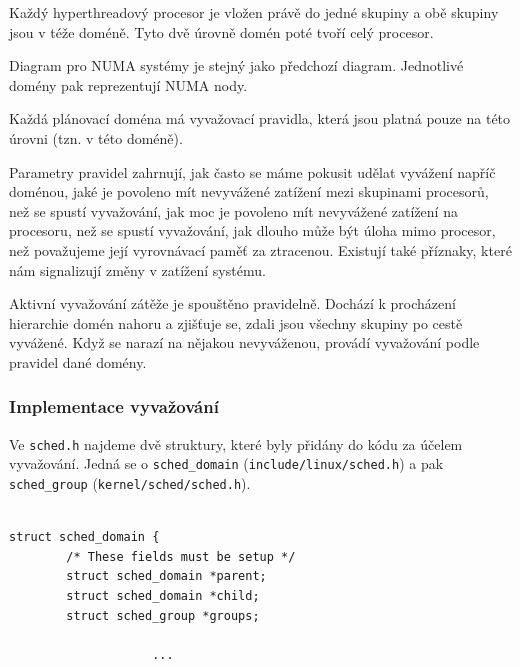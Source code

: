 \documentclass[
  master=true,
  font=sans,
  printversion=false,
  joinlists=true,
  figures=true,
  tables=true,
  sourcecodes=false,
  theorems=false,
  bibencoding=utf8,
  language=czech,
  encoding=utf8,
  field=ainfk,
  biblatex,
  glossaries,
  index
]{kidiplom}
\begin{document}
Každý hyperthreadový procesor je vložen právě do jedné skupiny a obě skupiny jsou v téže doméně. Tyto dvě úrovně domén poté tvoří celý procesor. 

Diagram pro NUMA systémy je stejný jako předchozí diagram. Jednotlivé domény pak reprezentují NUMA nody. 


Každá plánovací doména má vyvažovací pravidla, která jsou platná pouze na této úrovni (tzn. v této doméně). 

Parametry pravidel zahrnují, jak často se máme pokusit udělat vyvážení napříč doménou, jaké je povoleno mít nevyvážené zatížení mezi skupinami procesorů, než se spustí vyvažování, jak moc je povoleno mít nevyvážené zatížení na procesoru, než se spustí vyvažování, jak dlouho může být úloha mimo procesor, než považujeme její vyrovnávací paměť za ztracenou.
Existují také příznaky, které nám signalizují změny v zatížení systému. 

Aktivní vyvažování zátěže je spouštěno pravidelně. Dochází k procházení hierarchie domén nahoru a zjišťuje se, zdali jsou všechny skupiny po cestě vyvážené. Když se narazí na nějakou nevyváženou, provádí vyvažování podle pravidel dané domény.

\newpage
\subsubsection{Implementace vyvažování}

Ve \verb#sched.h# najdeme dvě struktury, které byly přidány do kódu za účelem vyvažování. Jedná se o \verb#sched_domain# (\verb#include/linux/sched.h#) a pak \verb#sched_group# (\verb#kernel/sched/sched.h#).

\begin{verbatim} 

struct sched_domain {
        /* These fields must be setup */
        struct sched_domain *parent;
        struct sched_domain *child;
        struct sched_group *groups;

                	...

\end{verbatim} 
\end{document}
